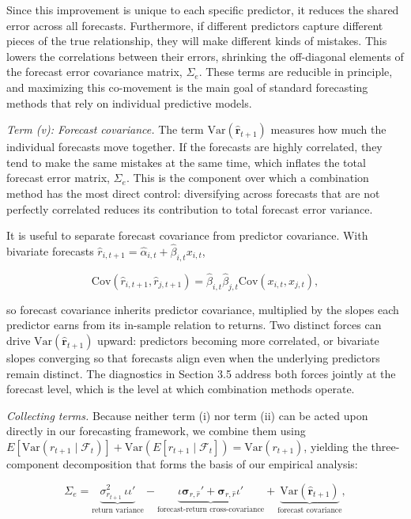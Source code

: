 \documentclass[a4paper,11pt]{article}
\begin{document}
Since this improvement is unique to each specific predictor, it reduces the shared error across all forecasts. Furthermore, if different predictors capture different pieces of the true relationship, they will make different kinds of mistakes. This lowers the correlations between their errors, shrinking the off-diagonal elements of the forecast error covariance matrix, $\Sigma_e$. These terms are reducible in principle, and maximizing this co-movement is the main goal of standard forecasting methods that rely on individual predictive models.

\textit{Term (v): Forecast covariance.} The term $\mathrm{Var}(\hat{\mathbf{r}}_{t+1})$ measures how much the individual forecasts move together. If the forecasts are highly correlated, they tend to make the same mistakes at the same time, which inflates the total forecast error matrix, $\Sigma_e$. This is the component over which a combination method has the most direct control: diversifying across forecasts that are not perfectly correlated reduces its contribution to total forecast error variance.

It is useful to separate forecast covariance from predictor covariance. With bivariate forecasts $\hat{r}_{i,t+1} = \hat{\alpha}_{i,t} + \hat{\beta}_{i,t} x_{i,t}$,

\begin{equation*}
\mathrm{Cov}(\hat{r}_{i,t+1}, \hat{r}_{j,t+1}) = \hat{\beta}_{i,t}\hat{\beta}_{j,t} \mathrm{Cov}(x_{i,t}, x_{j,t}),
\end{equation*}

\noindent so forecast covariance inherits predictor covariance, multiplied by the slopes each predictor earns from its in-sample relation to returns. Two distinct forces can drive $\mathrm{Var}(\hat{\mathbf{r}}_{t+1})$ upward: predictors becoming more correlated, or bivariate slopes converging so that forecasts align even when the underlying predictors remain distinct. The diagnostics in Section 3.5 address both forces jointly at the forecast level, which is the level at which combination methods operate.

\textit{Collecting terms.} Because neither term (i) nor term (ii) can be acted upon directly in our forecasting framework, we combine them using $E[\mathrm{Var}(r_{t+1} \mid \mathcal{F}_t)] + \mathrm{Var}(E[r_{t+1} \mid \mathcal{F}_t]) = \mathrm{Var}(r_{t+1})$, yielding the three-component decomposition that forms the basis of our empirical analysis:

\begin{equation}
\Sigma_e = \underbrace{\sigma_{r_{t+1}}^2 \, \iota\iota'}_{\text{return variance}} - \underbrace{\iota\boldsymbol{\sigma}_{r,\hat{r}}' + \boldsymbol{\sigma}_{r,\hat{r}}\iota'}_{\text{forecast-return cross-covariance}} + \underbrace{\mathrm{Var}(\hat{\mathbf{r}}_{t+1})}_{\text{forecast covariance}}, \label{eq:3-part-decomp}
\end{equation}
\end{document}
